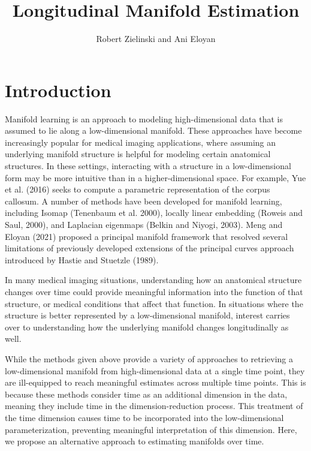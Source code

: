 \documentclass[11pt,reqno]{article}
\begin{document}
\title{Longitudinal Manifold Estimation}
\author[1]{Robert Zielinski and Ani Eloyan}


\maketitle

\section{Introduction}

Manifold learning is an approach to modeling high-dimensional data that is assumed to lie along a low-dimensional manifold. These approaches have become increasingly popular for medical imaging applications, where assuming an underlying manifold structure is helpful for modeling certain anatomical structures. In these settings, interacting with a structure in a low-dimensional form may be more intuitive than in a higher-dimensional space. For example, Yue et al. (2016) seeks to compute a parametric representation of the corpus callosum. A number of methods have been developed for manifold learning, including Isomap (Tenenbaum et al. 2000), locally linear embedding (Roweis and Saul, 2000), and Laplacian eigenmaps (Belkin and Niyogi, 2003). Meng and Eloyan (2021) proposed a principal manifold framework that resolved several limitations of previously developed extensions of the principal curves approach introduced by Hastie and Stuetzle (1989).

In many medical imaging situations, understanding how an anatomical structure changes over time could provide meaningful information into the function of that structure, or medical conditions that affect that function. In situations where the structure is better represented by a low-dimensional manifold, interest carries over to understanding how the underlying manifold changes longitudinally as well. 

While the methods given above provide a variety of approaches to retrieving a low-dimensional manifold from high-dimensional data at a single time point, they are ill-equipped to reach meaningful estimates across multiple time points. This is because these methods consider time as an additional dimension in the data, meaning they include time in the dimension-reduction process. This treatment of the time dimension causes time to be incorporated into the low-dimensional parameterization, preventing meaningful interpretation of this dimension. Here, we propose an alternative approach to estimating manifolds over time.
\end{document}
